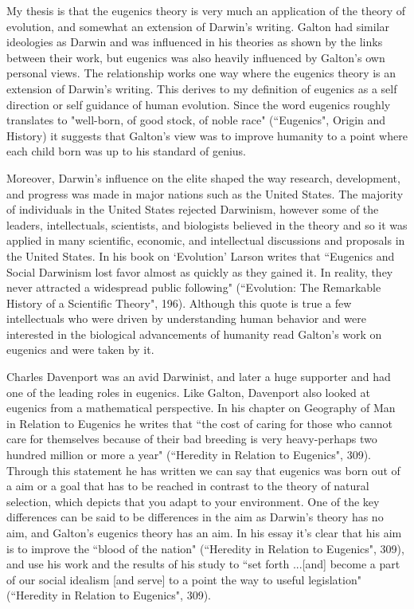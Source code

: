 \documentclass[11pt, oneside]{article}
\begin{document}
\par My thesis is that the eugenics theory is very much an application of the theory of evolution, and somewhat an extension of Darwin's writing. Galton had similar ideologies as Darwin and was influenced in his theories as shown by the links between their work, but eugenics was also heavily influenced by Galton's own personal views. The relationship works one way where the eugenics theory is an extension of Darwin's writing. This derives to my definition of eugenics as a self direction or self guidance of human evolution. Since the word eugenics roughly translates to "well-born, of good stock, of noble race" (``Eugenics", Origin and History) it suggests that Galton's view was to improve humanity to a point where each child born was up to his standard of genius. 

\par Moreover, Darwin's influence on the elite shaped the way research, development, and progress was made in major nations such as the United States. The majority of individuals in the United States rejected Darwinism, however some of the leaders, intellectuals, scientists, and biologists believed in the theory and so it was applied in many scientific, economic, and intellectual discussions and proposals in the United States. In his book on `Evolution' Larson writes that ``Eugenics and Social Darwinism lost favor almost as quickly as they gained it. In reality, they never attracted a widespread public following" (``Evolution: The Remarkable History of a Scientific Theory", 196). Although this quote is true a few intellectuals who were driven by understanding human behavior and were interested in the biological advancements of humanity read Galton's work on eugenics and were taken by it.

\par Charles Davenport was an avid Darwinist, and later a huge supporter and had one of the leading roles in eugenics. Like Galton, Davenport also looked at eugenics from a mathematical perspective. In his chapter on Geography of Man in Relation to Eugenics he writes that ``the cost of caring for those who cannot care for themselves because of their bad breeding is very heavy-perhaps two hundred million or more a year" (``Heredity in Relation to Eugenics", 309). Through this statement he has written we can say that eugenics was born out of a aim or a goal that has to be reached in contrast to the theory of natural selection, which depicts that you adapt to your environment. One of the key differences can be said to be differences in the aim as Darwin's theory has no aim, and Galton's eugenics theory has an aim. In his essay it's clear that his aim is to improve the ``blood of the nation" (``Heredity in Relation to Eugenics", 309), and use his work and the results of his study to ``set forth ...[and] become a part of our social idealism [and serve] to a point the way to useful legislation" (``Heredity in Relation to Eugenics", 309).
\end{document}
